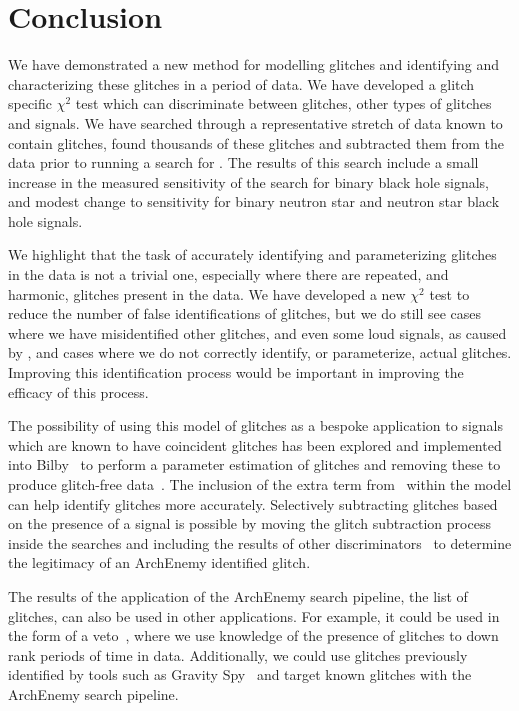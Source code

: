 \section{\label{4:sec:conclusion}Conclusion}

We have demonstrated a new method for modelling \scladj glitches and identifying and characterizing these glitches in a period of \gwadj data. We have developed a \scladj glitch specific $\chi^{2}$ test which can discriminate between \scladj glitches, other types of glitches and \gwadj signals. We have searched through a representative stretch of \gwadj data known to contain \scladj glitches, found thousands of these glitches and subtracted them from the \gwadj data prior to running a search for \gws. The results of this search include a small increase in the measured sensitivity of the \gwadj search for binary black hole \gwadj signals, and modest change to sensitivity for binary neutron star and neutron star black hole \gwadj signals.

We highlight that the task of accurately identifying and parameterizing \scladj glitches in the data is not a trivial one, especially where there are repeated, and harmonic, glitches present in the data. We have developed a new $\chi^{2}$ test to reduce the number of false identifications of \scladj glitches, but we do still see cases where we have misidentified other glitches, and even some loud \gwadj signals, as caused by \scl, and cases where we do not correctly identify, or parameterize, actual \scladj glitches. Improving this identification process would be important in improving the efficacy of this process.

The possibility of using this model of \scladj glitches as a bespoke application to \gwadj signals which are known to have coincident \scladj glitches has been explored and implemented into Bilby~\cite{BILBY:2019} to perform a parameter estimation of \scladj glitches and removing these to produce glitch-free data~\cite{Udall:2023}. The inclusion of the extra term from~\cite{Was_Subtract:2021} within the model can help identify \scladj glitches more accurately. Selectively subtracting glitches based on the presence of a \gwadj signal is possible by moving the glitch subtraction process inside the \gwadj searches and including the results of other \gwadj discriminators~\cite{rw_snr_eq:2012, McIsaac_Chi:2022} to determine the legitimacy of an ArchEnemy identified glitch.

The results of the application of the ArchEnemy search pipeline, the list of \scladj glitches, can also be used in other applications. For example, it could be used in the form of a veto~\cite{O2O3_DetChar:2021}, where we use knowledge of the presence of \scladj glitches to down rank periods of time in \gwadj data. Additionally, we could use \scladj glitches previously identified by tools such as Gravity Spy~\cite{gravityspy:2023} and target known \scladj glitches with the ArchEnemy search pipeline.

